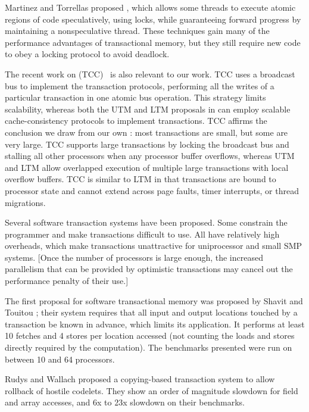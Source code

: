 Martinez and Torrellas proposed 
\cite{MartinezTo02}, which allows some threads to execute atomic
regions of code speculatively, using locks, while guaranteeing forward
progress by maintaining a nonspeculative thread.  These techniques
gain many of the performance advantages of transactional memory, but
they still require new code to obey a locking protocol to avoid
deadlock.

The recent work on  (TCC)~\cite{HammondWoCh04} is also relevant to our work.
TCC uses a broadcast bus to implement the transaction protocols,
performing all the writes of a particular transaction in one atomic
bus operation.  This strategy limits scalability, whereas both the UTM and
LTM proposals in 
can employ scalable cache-consistency protocols to implement
transactions.  TCC affirms the conclusion we draw from our own
: most transactions are small, but some are very large.  TCC
supports large transactions by locking the broadcast bus and stalling
all other processors when any processor buffer overflows, whereas UTM
and LTM allow overlapped execution of multiple large transactions with
local overflow buffers.  TCC is similar to LTM in that transactions
are bound to processor state and cannot extend across page faults,
timer interrupts, or thread migrations.


Several software transaction systems have been proposed.  Some constrain the
programmer and make transactions difficult to use.  All have
relatively high overheads, which make transactions unattractive for
uniprocessor and small SMP systems. [Once the number of processors is
large enough, the increased parallelism that can be provided by
optimistic transactions may cancel out the performance penalty of
their use.]

The first proposal for software transactional memory was proposed by
Shavit and Touitou \cite{ShavitTo95}; their system requires that all
input and output locations touched by a transaction be known in
advance, which limits its application.  It performs at least 10
fetches and 4 stores per location accessed (not counting the loads and
stores directly required by the computation).  The benchmarks
presented were run on between 10 and 64 processors.

Rudys and Wallach \cite{RudysWa02} proposed a copying-based
transaction system to allow rollback of hostile codelets.
They show an order of magnitude slowdown for field and array
accesses, and 6x to 23x slowdown on their benchmarks.

